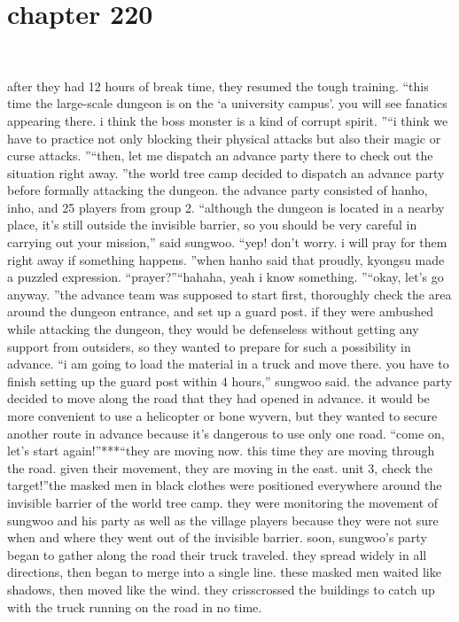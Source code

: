 \section{chapter 220}

                             




after they had 12 hours of break time, they resumed the tough training.
“this time the large-scale dungeon is on the ‘a university campus’.
 you will see fanatics appearing there.
 i think the boss monster is a kind of corrupt spirit.
”“i think we have to practice not only blocking their physical attacks but also their magic or curse attacks.
”“then, let me dispatch an advance party there to check out the situation right away.
”the world tree camp decided to dispatch an advance party before formally attacking the dungeon.
 the advance party consisted of hanho, inho, and 25 players from group 2.
“although the dungeon is located in a nearby place, it’s still outside the invisible barrier, so you should be very careful in carrying out your mission,” said sungwoo.
“yep! don’t worry.
 i will pray for them right away if something happens.
”when hanho said that proudly, kyongsu made a puzzled expression.
“prayer?”“hahaha, yeah i know something.
”“okay, let’s go anyway.
”the advance team was supposed to start first, thoroughly check the area around the dungeon entrance, and set up a guard post.
if they were ambushed while attacking the dungeon, they would be defenseless without getting any support from outsiders, so they wanted to prepare for such a possibility in advance.
“i am going to load the material in a truck and move there.
 you have to finish setting up the guard post within 4 hours,” sungwoo said.
the advance party decided to move along the road that they had opened in advance.
 it would be more convenient to use a helicopter or bone wyvern, but they wanted to secure another route in advance because it’s dangerous to use only one road.
“come on, let’s start again!”***“they are moving now.
 this time they are moving through the road.
 given their movement, they are moving in the east.
 unit 3, check the target!”the masked men in black clothes were positioned everywhere around the invisible barrier of the world tree camp.
 they were monitoring the movement of sungwoo and his party as well as the village players because they were not sure when and where they went out of the invisible barrier.
soon, sungwoo’s party began to gather along the road their truck traveled.
 they spread widely in all directions, then began to merge into a single line.
these masked men waited like shadows, then moved like the wind.
 they crisscrossed the buildings to catch up with the truck running on the road in no time.

